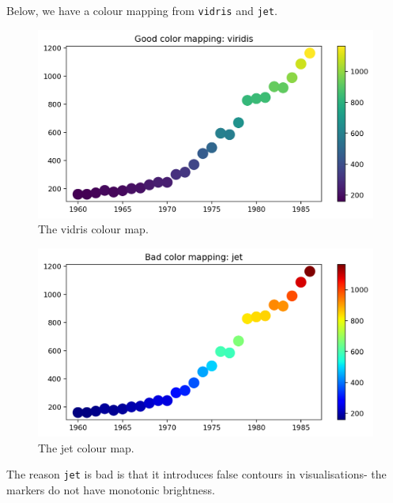 \documentclass[a4paper, openany]{memoir}
\begin{document}
Below, we have a colour mapping from \texttt{vidris} and \texttt{jet}.
\begin{figure}[H]
    \centering
    \includegraphics[scale=0.5]{src/2.43 vidris colour map.png}
    \caption{The vidris colour map.}
\end{figure}
\begin{figure}[H]
    \centering
    \includegraphics[scale=0.5]{src/2.44 jet colour map.png}
    \caption{The jet colour map.}
\end{figure}
\noindent The reason \texttt{jet} is bad is that it introduces false contours in visualisations- the markers do not have monotonic brightness.
\end{document}
